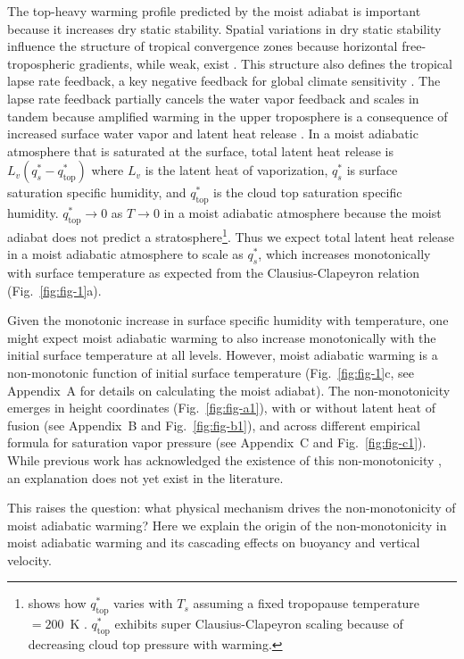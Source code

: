 \documentclass[draft,twocol]{ametsocV6.1}
\begin{document}
The top-heavy warming profile predicted by the moist adiabat is important because it increases dry static stability. Spatial variations in dry static stability influence the structure of tropical convergence zones because horizontal free-tropospheric gradients, while weak, exist \citep{neelin1987, bao2022}. This structure also defines the tropical lapse rate feedback, a key negative feedback for global climate sensitivity \citep{hansen1984}. The lapse rate feedback partially cancels the water vapor feedback and scales in tandem because amplified warming in the upper troposphere is a consequence of increased surface water vapor and latent heat release \citep{held2012}. In a moist adiabatic atmosphere that is saturated at the surface, total latent heat release is $L_v (q_s^*-q_\mathrm{top}^*)$ where $L_v$ is the latent heat of vaporization, $q_s^*$ is surface saturation specific humidity, and $q_\mathrm{top}^*$ is the cloud top saturation specific humidity. $q_\mathrm{top}^*\to0$ as $T\to0$ in a moist adiabatic atmosphere because the moist adiabat does not predict a stratosphere\footnote{\cite{romps2016} shows how $q_\mathrm{top}^*$ varies with $T_s$ assuming a fixed tropopause temperature $= 200$~K \citep[see][for evidence supporting this assumption]{hartmann2002, seeley2019}. $q_\mathrm{top}^*$ exhibits super Clausius-Clapeyron scaling because of decreasing cloud top pressure with warming.}. Thus we expect total latent heat release in a moist adiabatic atmosphere to scale as $q_s^*$, which increases monotonically with surface temperature as expected from the Clausius-Clapeyron relation (Fig.~\ref{fig:fig-1}a).

Given the monotonic increase in surface specific humidity with temperature, one might expect moist adiabatic warming to also increase monotonically with the initial surface temperature at all levels. However, moist adiabatic warming is a non-monotonic function of initial surface temperature (Fig.~\ref{fig:fig-1}c, see Appendix~A for details on calculating the moist adiabat). The non-monotonicity emerges in height coordinates (Fig.~\ref{fig:fig-a1}), with or without latent heat of fusion (see Appendix~B and Fig.~\ref{fig:fig-b1}), and across different empirical formula for saturation vapor pressure (see Appendix~C and Fig.~\ref{fig:fig-c1}). While previous work has acknowledged the existence of this non-monotonicity \citep{byrne2013, levine2016}, an explanation does not yet exist in the literature.

This raises the question: what physical mechanism drives the non-monotonicity of moist adiabatic warming? Here we explain the origin of the non-monotonicity in moist adiabatic warming and its cascading effects on buoyancy and vertical velocity.
\end{document}
